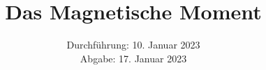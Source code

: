 

\subject{\texorpdfstring{\vspace{2ex}}{}105\texorpdfstring{\vspace{-2ex}}{}} %
\title{Das Magnetische Moment} %
\date{
	Durchführung: 10. Januar 2023 %
	\\ Abgabe: 17. Januar 2023 %
}




\maketitle
\thispagestyle{empty}
\tableofcontents
\newpage






\printbibliography{}


